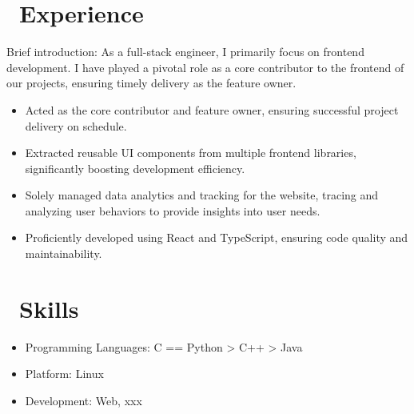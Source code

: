 \documentclass{resume}
\begin{document}



\section{\faUsers\ Experience}
\role{Software Developer}

Brief introduction: As a full-stack engineer, I primarily focus on frontend development. I have played a pivotal role as a core contributor to the frontend of our projects, ensuring timely delivery as the feature owner.
\begin{itemize}
  \item Acted as the core contributor and feature owner, ensuring successful project delivery on schedule.
  \item Extracted reusable UI components from multiple frontend libraries, significantly boosting development efficiency.
  \item Solely managed data analytics and tracking for the website, tracing and analyzing user behaviors to provide insights into user needs.
  \item Proficiently developed using React and TypeScript, ensuring code quality and maintainability.
\end{itemize}


\section{\faCogs\ Skills}
\begin{itemize}[parsep=0.5ex]
  \item Programming Languages: C == Python > C++ > Java
  \item Platform: Linux
  \item Development: Web, xxx
\end{itemize}
\end{document}
